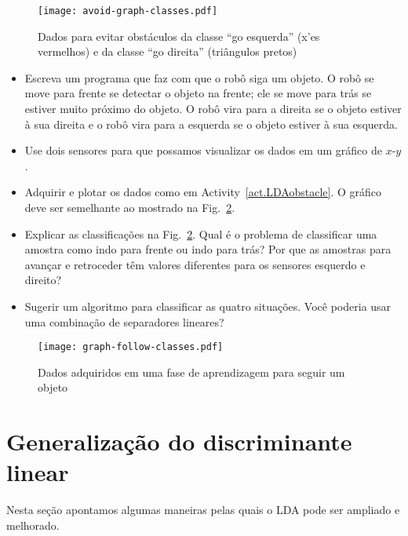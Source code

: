 \begin{figure}
\begin{center}
\texttt{[image: avoid-graph-classes.pdf]}
\end{center}
\caption{Dados para evitar obstáculos da classe ``go esquerda'' (x'es vermelhos) e da classe ``go direita'' (triângulos pretos)}\label{fig.machlearnavoid}
\end{figure}

\begin{framed}
\begin{itemize}
\item Escreva um programa que faz com que o robô siga um objeto. O robô se move para frente se detectar o objeto na frente; ele se move para trás se estiver muito próximo do objeto. O robô vira para a direita se o objeto estiver à sua direita e o robô vira para a esquerda se o objeto estiver à sua esquerda.
\item Use dois sensores para que possamos visualizar os dados em um gráfico de $x$-$y$.
\item Adquirir e plotar os dados como em Activity~\ref{act.LDAobstacle}. O gráfico deve ser semelhante ao mostrado na Fig.~\ref{fig.machlearnfollow}.
\item Explicar as classificações na Fig.~\ref{fig.machlearnfollow}. Qual é o problema de classificar uma amostra como indo para frente ou indo para trás? Por que as amostras para avançar e retroceder têm valores diferentes para os sensores esquerdo e direito?
\item Sugerir um algoritmo para classificar as quatro situações. Você poderia usar uma combinação de separadores lineares?
\end{itemize}
\end{framed}

\begin{figure}
\begin{center}
\texttt{[image: graph-follow-classes.pdf]}
\end{center}
\caption{Dados adquiridos em uma fase de aprendizagem para seguir um objeto}\label{fig.machlearnfollow}
\end{figure}

\section{Generalização do discriminante linear}\label{s.gen-lda}

Nesta seção apontamos algumas maneiras pelas quais o LDA pode ser ampliado e melhorado.

